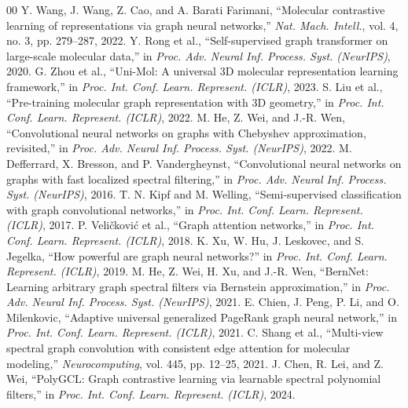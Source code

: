 \documentclass[conference]{IEEEtran}
\begin{document}
\begin{thebibliography}{00}
 Y. Wang, J. Wang, Z. Cao, and A. Barati Farimani, ``Molecular contrastive learning of representations via graph neural networks,'' \textit{Nat. Mach. Intell.}, vol. 4, no. 3, pp. 279--287, 2022.
 Y. Rong et al., ``Self-supervised graph transformer on large-scale molecular data,'' in \textit{Proc. Adv. Neural Inf. Process. Syst. (NeurIPS)}, 2020.
 G. Zhou et al., ``Uni-Mol: A universal 3D molecular representation learning framework,'' in \textit{Proc. Int. Conf. Learn. Represent. (ICLR)}, 2023.
 S. Liu et al., ``Pre-training molecular graph representation with 3D geometry,'' in \textit{Proc. Int. Conf. Learn. Represent. (ICLR)}, 2022.
 M. He, Z. Wei, and J.-R. Wen, ``Convolutional neural networks on graphs with Chebyshev approximation, revisited,'' in \textit{Proc. Adv. Neural Inf. Process. Syst. (NeurIPS)}, 2022.
 M. Defferrard, X. Bresson, and P. Vandergheynst, ``Convolutional neural networks on graphs with fast localized spectral filtering,'' in \textit{Proc. Adv. Neural Inf. Process. Syst. (NeurIPS)}, 2016.
 T. N. Kipf and M. Welling, ``Semi-supervised classification with graph convolutional networks,'' in \textit{Proc. Int. Conf. Learn. Represent. (ICLR)}, 2017.
 P. Veli\v{c}kovi\'{c} et al., ``Graph attention networks,'' in \textit{Proc. Int. Conf. Learn. Represent. (ICLR)}, 2018.
 K. Xu, W. Hu, J. Leskovec, and S. Jegelka, ``How powerful are graph neural networks?'' in \textit{Proc. Int. Conf. Learn. Represent. (ICLR)}, 2019.
 M. He, Z. Wei, H. Xu, and J.-R. Wen, ``BernNet: Learning arbitrary graph spectral filters via Bernstein approximation,'' in \textit{Proc. Adv. Neural Inf. Process. Syst. (NeurIPS)}, 2021.
 E. Chien, J. Peng, P. Li, and O. Milenkovic, ``Adaptive universal generalized PageRank graph neural network,'' in \textit{Proc. Int. Conf. Learn. Represent. (ICLR)}, 2021.
 C. Shang et al., ``Multi-view spectral graph convolution with consistent edge attention for molecular modeling,'' \textit{Neurocomputing}, vol. 445, pp. 12--25, 2021.
 J. Chen, R. Lei, and Z. Wei, ``PolyGCL: Graph contrastive learning via learnable spectral polynomial filters,'' in \textit{Proc. Int. Conf. Learn. Represent. (ICLR)}, 2024.

\end{thebibliography}
\end{document}
